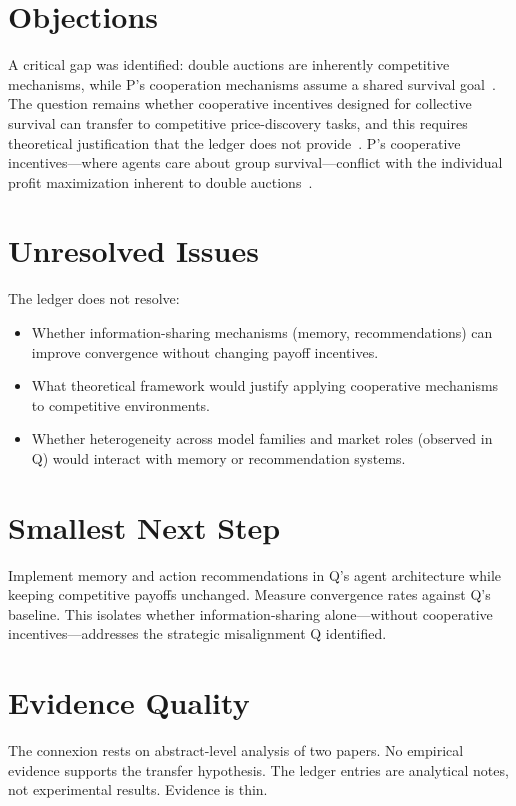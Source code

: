 \documentclass{article}
\begin{document}
\section*{Objections}

A critical gap was identified: double auctions are inherently competitive mechanisms, while P's cooperation mechanisms assume a shared survival goal~. The question remains whether cooperative incentives designed for collective survival can transfer to competitive price-discovery tasks, and this requires theoretical justification that the ledger does not provide~. P's cooperative incentives---where agents care about group survival---conflict with the individual profit maximization inherent to double auctions~.

\section*{Unresolved Issues}

The ledger does not resolve:
\begin{itemize}
  \item Whether information-sharing mechanisms (memory, recommendations) can improve convergence without changing payoff incentives.
  \item What theoretical framework would justify applying cooperative mechanisms to competitive environments.
  \item Whether heterogeneity across model families and market roles (observed in Q) would interact with memory or recommendation systems.
\end{itemize}

\section*{Smallest Next Step}

Implement memory and action recommendations in Q's agent architecture while keeping competitive payoffs unchanged. Measure convergence rates against Q's baseline. This isolates whether information-sharing alone---without cooperative incentives---addresses the strategic misalignment Q identified.

\section*{Evidence Quality}

The connexion rests on abstract-level analysis of two papers. No empirical evidence supports the transfer hypothesis. The ledger entries are analytical notes, not experimental results. Evidence is thin.
\end{document}
